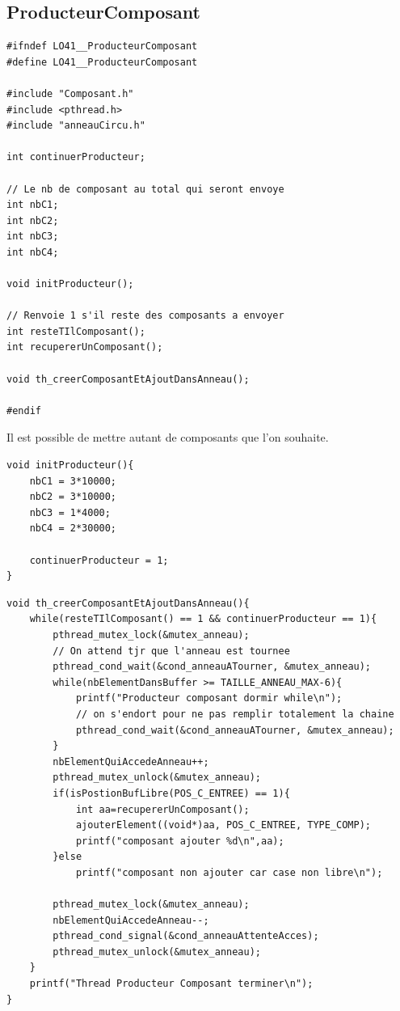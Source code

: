 \documentclass{report}
\begin{document}
\subsection{ProducteurComposant}
\begin{lstlisting}[caption=Représentation du producteur de composant]
#ifndef LO41__ProducteurComposant
#define LO41__ProducteurComposant

#include "Composant.h"
#include <pthread.h>
#include "anneauCircu.h"

int continuerProducteur;

// Le nb de composant au total qui seront envoye
int nbC1;
int nbC2;
int nbC3;
int nbC4;

void initProducteur();

// Renvoie 1 s'il reste des composants a envoyer
int resteTIlComposant();
int recupererUnComposant();

void th_creerComposantEtAjoutDansAnneau();
    
#endif
\end{lstlisting}

Il est possible de mettre autant de composants que l'on souhaite.
\begin{lstlisting}[caption=Initialisation du producteur de composant]
void initProducteur(){
    nbC1 = 3*10000;
    nbC2 = 3*10000;
    nbC3 = 1*4000;
    nbC4 = 2*30000;
    
    continuerProducteur = 1;
}
\end{lstlisting}

\begin{lstlisting}[caption=Fonction thread du producteur]
void th_creerComposantEtAjoutDansAnneau(){
    while(resteTIlComposant() == 1 && continuerProducteur == 1){
        pthread_mutex_lock(&mutex_anneau);
        // On attend tjr que l'anneau est tournee
        pthread_cond_wait(&cond_anneauATourner, &mutex_anneau);
        while(nbElementDansBuffer >= TAILLE_ANNEAU_MAX-6){
            printf("Producteur composant dormir while\n");
            // on s'endort pour ne pas remplir totalement la chaine
            pthread_cond_wait(&cond_anneauATourner, &mutex_anneau);
        }
        nbElementQuiAccedeAnneau++;
        pthread_mutex_unlock(&mutex_anneau);
        if(isPostionBufLibre(POS_C_ENTREE) == 1){
            int aa=recupererUnComposant();
            ajouterElement((void*)aa, POS_C_ENTREE, TYPE_COMP);
            printf("composant ajouter %d\n",aa);
        }else
            printf("composant non ajouter car case non libre\n");
        
        pthread_mutex_lock(&mutex_anneau);
        nbElementQuiAccedeAnneau--;
        pthread_cond_signal(&cond_anneauAttenteAcces);
        pthread_mutex_unlock(&mutex_anneau);
    }
    printf("Thread Producteur Composant terminer\n");
}
\end{lstlisting}
\end{document}
